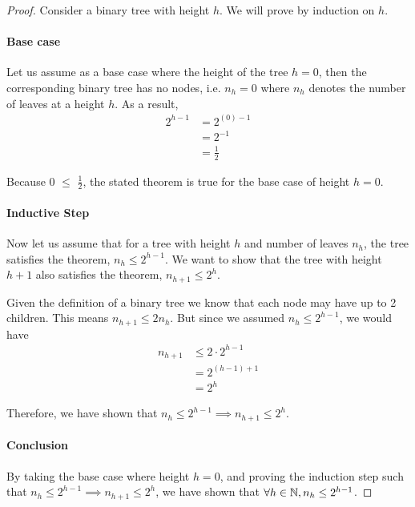 \documentclass[11pt]{article}
\begin{document}
\begin{proof}
Consider a binary tree with height $h$. We will prove by induction on $h$.

\paragraph{Base case}

Let us assume as a base case where the height of the tree $h = 0$, then the corresponding binary tree has no nodes, i.e. $n_h = 0$ where $n_h$ denotes the number of leaves at a height $h$. As a result, 
\begin{align*}
    2^{h-1} &= 2^{(0)-1} \\
    &= 2^{-1} \\
    &= \frac{1}{2}
\end{align*}

Because $0$ $\leq$ $\frac{1}{2}$, the stated theorem is true for the base case of height $h=0$.

\paragraph{Inductive Step}

Now let us assume that for a tree with height $h$ and number of leaves $n_h$, the tree satisfies the theorem, $n_h \leq 2^{h-1}$. We want to show that the tree with height $h+1$ also satisfies the theorem, $n_{h+1} \leq 2^h$.

Given the definition of a binary tree we know that each node may have up to 2 children. This means $n_{h+1} \leq 2n_h$. But since we assumed $n_h \leq 2^{h-1}$, we would have
\begin{align*}
    n_{h+1} &\leq 2 \cdot 2^{h-1}\\
    &= 2^{(h-1)+1} \\
    &= 2^h
\end{align*}

Therefore, we have shown that $n_h \leq 2^{h-1} \implies n_{h+1} \leq 2^h$.

\paragraph{Conclusion}

By taking the base case where height $h=0$, and proving the induction step such that $n_h \leq 2^{h-1} \implies{} n_{h+1} \leq 2^{h}$, we have shown that $\forall h \in \mathbb{N},  n_h \leq 2^{h-1}$.


\end{proof}
\end{document}
